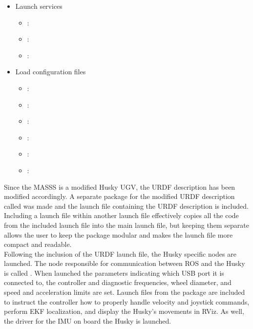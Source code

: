 \begin{itemize}
\begin{itemize}
\end{itemize}

\item Launch services

\begin{itemize}

\item {} : 
\item {} : 
\item {} : 

\end{itemize}

\item Load configuration files

\begin{itemize}

\item {} : 
\item {} : 
\item {} : 
\item {} : 
\item {} : 
\item {} : 
\end{itemize}

\end{itemize}

Since the MASSS is a modified Husky UGV, the URDF description has been modified accordingly. A separate package for the modified URDF description called  was made and the launch file containing the URDF description is included. Including a launch file within another launch file effectively copies all the code from the included launch file into the main launch file, but keeping them separate allows the user to keep the package modular and makes the launch file more compact and readable.\\

Following the inclusion of the URDF launch file, the Husky specific nodes are launched. The node responsible for communication between ROS and the Husky is called . When launched the parameters indicating which USB port it is connected to, the controller and diagnostic frequencies, wheel diameter, and speed and acceleration limits are set. Launch files from the  package are included to instruct the controller how to properly handle  velocity and joystick commands, perform EKF localization, and display the Husky's movements in RViz. As well, the driver for the IMU on board the Husky is launched.\\

